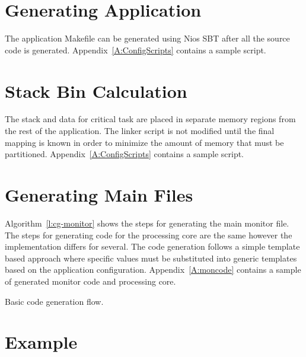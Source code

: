 \section{Generating Application}

The application Makefile can be generated using Nios SBT after all the source code is generated. Appendix~\ref{A:ConfigScripts} contains a sample script.

\section{Stack Bin Calculation}

	The stack and data for critical task are placed in separate memory regions from the rest of the application. 
	The linker script is not modified until the final mapping is known in order to minimize the amount of memory that must be partitioned.
	Appendix~\ref{A:ConfigScripts} contains a sample script.

\section{Generating Main Files}

	Algorithm~\ref{l:cg-monitor} shows the steps for generating the main monitor file. 
	The steps for generating code for the processing core are the same however the implementation differs for several. 
	The code generation follows a simple template based approach where specific values must be substituted into generic templates based on the application configuration.
	Appendix~\ref{A:moncode} contains a sample of generated monitor code and processing core.


\begin{algorithm}

\caption{Basic code generation flow.}
\label{l:cg-monitor}
\end{algorithm}


\section{Example}

